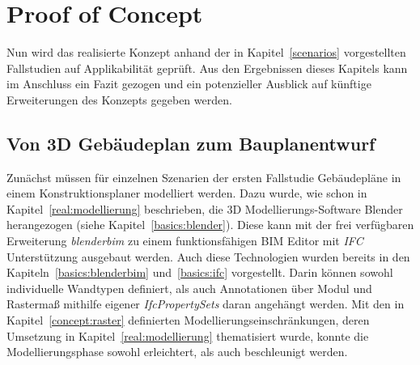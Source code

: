 \chapter{Proof of Concept}
Nun wird das realisierte Konzept anhand der in Kapitel~\ref{scenarios} vorgestellten Fallstudien auf Applikabilität geprüft.
Aus den Ergebnissen dieses Kapitels kann im Anschluss ein Fazit gezogen und ein potenzieller Ausblick auf künftige Erweiterungen des Konzepts gegeben werden.

\section{Von 3D Gebäudeplan zum Bauplanentwurf}
Zunächst müssen für einzelnen Szenarien der ersten Fallstudie Gebäudepläne in einem Konstruktionsplaner modelliert werden.
Dazu wurde, wie schon in Kapitel~\ref{real:modellierung} beschrieben, die 3D Modellierungs-Software Blender herangezogen (siehe Kapitel~\ref{basics:blender}).
Diese kann mit der frei verfügbaren Erweiterung \textit{blenderbim} zu einem funktionsfähigen BIM Editor mit \textit{IFC} Unterstützung ausgebaut werden.
Auch diese Technologien wurden bereits in den Kapiteln~\ref{basics:blenderbim} und~\ref{basics:ifc} vorgestellt.
Darin können sowohl individuelle Wandtypen definiert, als auch Annotationen über Modul und Rastermaß mithilfe eigener \textit{IfcPropertySets} daran angehängt werden.
Mit den in Kapitel~\ref{concept:raster} definierten Modellierungseinschränkungen, deren Umsetzung in Kapitel~\ref{real:modellierung} thematisiert wurde, konnte die Modellierungsphase sowohl erleichtert, als auch beschleunigt werden.

